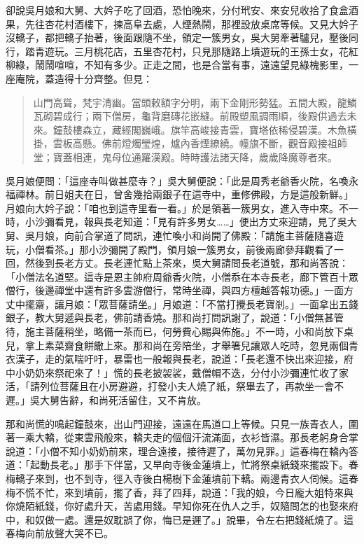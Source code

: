 卻說吳月娘和大舅、大妗子吃了回酒，恐怕晚來，分付玳安、來安兒收拾了食盒酒果，先往杏花村酒樓下，揀高阜去處，人煙熱鬧，那裡設放桌席等候。又見大妗子沒轎子，都把轎子抬著，後面跟隨不坐，領定一簇男女，吳大舅牽著驢兒，壓後同行，踏青遊玩。三月桃花店，五里杏花村，只見那隨路上墳遊玩的王孫士女，花紅柳綠，鬧鬧喧喧，不知有多少。正走之間，也是合當有事，遠遠望見綠槐影里，一座庵院，蓋造得十分齊整。但見：
\begin{quote}
山門高聳，梵宇清幽。當頭敕額字分明，兩下金剛形勢猛。五間大殿，龍鱗瓦砌碧成行；兩下僧房，龜背磨磚花嵌縫。前殿塑風調雨順，後殿供過去未來。鐘鼓樓森立，藏經閣巍峨。旗竿高峻接青雲，寶塔依稀侵碧漢。木魚橫掛，雲板高懸。佛前燈燭瑩煌，爐內香煙繚繞。幢旗不斷，觀音殿接祖師堂；寶蓋相連，鬼母位通羅漢殿。時時護法諸天降，歲歲降魔尊者來。
\end{quote}

吳月娘便問：「這座寺叫做甚麼寺？」吳大舅便說：「此是周秀老爺香火院，名喚永福禪林。前日姐夫在日，曾舍幾拾兩銀子在這寺中，重修佛殿，方是這般新鮮。」月娘向大妗子說：「咱也到這寺里看一看。」於是領著一簇男女，進入寺中來。不一時，小沙彌看見，報與長老知道：「見有許多男女……」便出方丈來迎請，見了吳大舅、吳月娘，向前合掌道了問訊，連忙喚小和尚開了佛殿：「請施主菩薩隨喜遊玩，小僧看茶。」那小沙彌開了殿門，領月娘一簇男女，前後兩廊參拜觀看了一回，然後到長老方丈。長老連忙點上茶來，吳大舅請問長老道號，那和尚答說：「小僧法名道堅。這寺是恩主帥府周爺香火院，小僧忝在本寺長老，廊下管百十眾僧行，後邊禪堂中還有許多雲游僧行，常時坐禪，與四方檀越答報功德。」一面方丈中擺齋，讓月娘：「眾菩薩請坐。」月娘道：「不當打攪長老寶剎。」一面拿出五錢銀子，教大舅遞與長老，佛前請香燒。那和尚打問訊謝了，說道：「小僧無甚管待，施主菩薩稍坐，略備一茶而已，何勞費心賜與佈施。」不一時，小和尚放下桌兒，拿上素菜齋食餅饊上來。那和尚在旁陪坐，才舉箸兒讓眾人吃時，忽見兩個青衣漢子，走的氣喘吁吁，暴雷也一般報與長老，說道：「長老還不快出來迎接，府中小奶奶來祭祀來了！」慌的長老披袈裟，戴僧帽不迭，分付小沙彌連忙收了家活，「請列位菩薩且在小房避避，打發小夫人燒了紙，祭畢去了，再款坐一會不遲。」吳大舅告辭，和尚死活留住，又不肯放。

那和尚慌的鳴起鐘鼓來，出山門迎接，遠遠在馬道口上等候。只見一族青衣人，圍著一乘大轎，從東雲飛般來，轎夫走的個個汗流滿面，衣衫皆濕。那長老躬身合掌說道：「小僧不知小奶奶前來，理合遠接，接待遲了，萬勿見罪。」這春梅在轎內答道：「起動長老。」那手下伴當，又早向寺後金蓮墳上，忙將祭桌紙錢來擺設下。春梅轎子來到，也不到寺，徑入寺後白楊樹下金蓮墳前下轎。兩邊青衣人伺候。這春梅不慌不忙，來到墳前，擺了香，拜了四拜，說道：「我的娘，今日龐大姐特來與你燒陌紙錢，你好處升天，苦處用錢。早知你死在仇人之手，奴隨問怎的也娶來府中，和奴做一處。還是奴耽誤了你，悔已是遲了。」說畢，令左右把錢紙燒了。這春梅向前放聲大哭不已。

